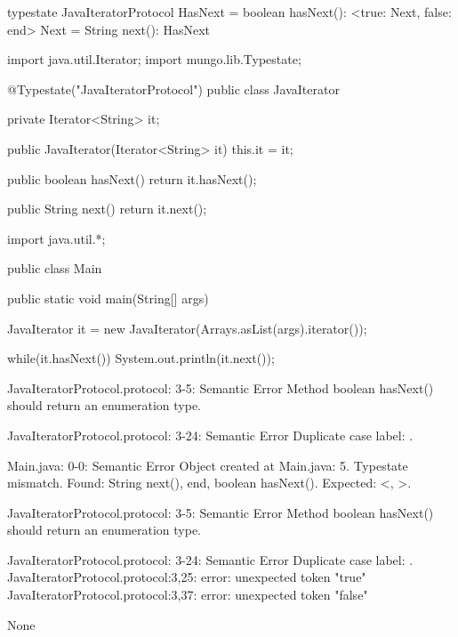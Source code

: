 \begin{code}
typestate JavaIteratorProtocol {
  HasNext = {
    boolean hasNext(): <true: Next, false: end>
  }
  Next = {
    String next(): HasNext
  }
}\end{code}

\begin{code}
import java.util.Iterator;
import mungo.lib.Typestate;

@Typestate("JavaIteratorProtocol")
public class JavaIterator {

  private Iterator<String> it;

  public JavaIterator(Iterator<String> it) {
    this.it = it;
  }

	public boolean hasNext() {
    return it.hasNext();
  }

  public String next() {
    return it.next();
  }

}\end{code}

\begin{code}
import java.util.*;

public class Main {
	public static void main(String[] args) {
		JavaIterator it = new JavaIterator(Arrays.asList(args).iterator());
    
    while(it.hasNext()){
      System.out.println(it.next());
    }
	}
}\end{code}

\lstset{language=,caption=Original Mungo output}
\begin{code}

JavaIteratorProtocol.protocol: 3-5: Semantic Error
		Method boolean hasNext() should return an enumeration type.

JavaIteratorProtocol.protocol: 3-24: Semantic Error
		Duplicate case label: .

Main.java: 0-0: Semantic Error
		Object created at Main.java: 5. Typestate mismatch. Found: String next(), end, boolean hasNext(). Expected: <, >.

JavaIteratorProtocol.protocol: 3-5: Semantic Error
		Method boolean hasNext() should return an enumeration type.

JavaIteratorProtocol.protocol: 3-24: Semantic Error
		Duplicate case label: .
JavaIteratorProtocol.protocol:3,25: error: unexpected token "true"
JavaIteratorProtocol.protocol:3,37: error: unexpected token "false"
\end{code}

\lstset{language=,caption=New Mungo output}
\begin{code}
None
\end{code}


